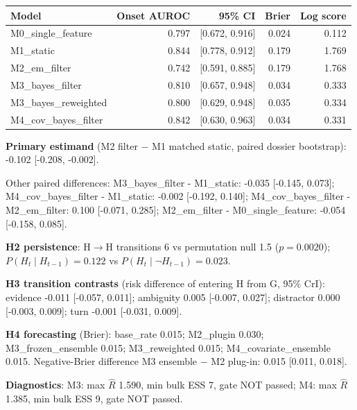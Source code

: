 \begin{center}\small\begin{tabular}{lrrrr}\toprule Model & Onset AUROC & 95\% CI & Brier & Log score\\\midrule

M0\_single\_feature & 0.797 & [0.672, 0.916] & 0.024 & 0.112\\

M1\_static & 0.844 & [0.778, 0.912] & 0.179 & 1.769\\

M2\_em\_filter & 0.742 & [0.591, 0.885] & 0.179 & 1.768\\

M3\_bayes\_filter & 0.810 & [0.657, 0.948] & 0.034 & 0.333\\

M3\_bayes\_reweighted & 0.800 & [0.629, 0.948] & 0.035 & 0.334\\

M4\_cov\_bayes\_filter & 0.842 & [0.630, 0.963] & 0.034 & 0.331\\

\bottomrule\end{tabular}\end{center}

\textbf{Primary estimand} (M2 filter $-$ M1 matched static, paired dossier bootstrap): -0.102 [-0.208, -0.002]. 

Other paired differences: M3\_bayes\_filter - M1\_static: -0.035 [-0.145, 0.073]; M4\_cov\_bayes\_filter - M1\_static: -0.002 [-0.192, 0.140]; M4\_cov\_bayes\_filter - M2\_em\_filter: 0.100 [-0.071, 0.285]; M2\_em\_filter - M0\_single\_feature: -0.054 [-0.158, 0.085].

\textbf{H2 persistence}: H$\to$H transitions 6 vs permutation null 1.5 ($p=0.0020$); $P(H_t\mid H_{t-1})=0.122$ vs $P(H_t\mid \neg H_{t-1})=0.023$.

\textbf{H3 transition contrasts} (risk difference of entering H from G, 95\% CrI): evidence -0.011 [-0.057, 0.011]; ambiguity 0.005 [-0.007, 0.027]; distractor 0.000 [-0.003, 0.009]; turn -0.001 [-0.031, 0.009].

\textbf{H4 forecasting} (Brier): base\_rate 0.015; M2\_plugin 0.030; M3\_frozen\_ensemble 0.015; M3\_reweighted 0.015; M4\_covariate\_ensemble 0.015. Negative-Brier difference M3 ensemble $-$ M2 plug-in: 0.015 [0.011, 0.018].

\textbf{Diagnostics}: M3: max $\widehat R$ 1.590, min bulk ESS 7, gate NOT passed; M4: max $\widehat R$ 1.385, min bulk ESS 9, gate NOT passed.

